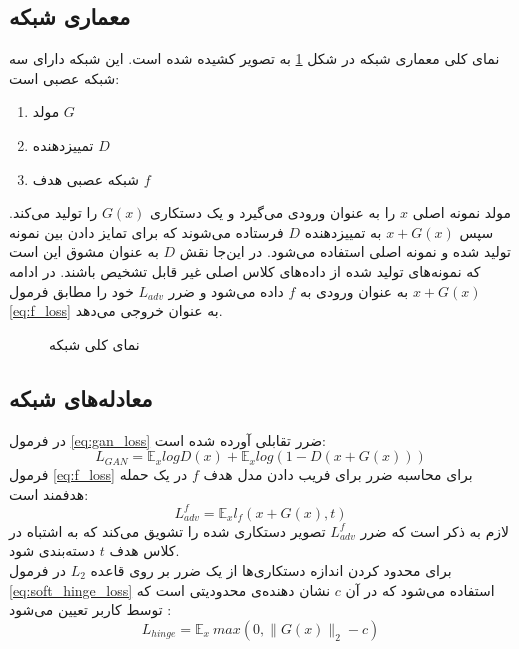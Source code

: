 \subsection{معماری شبکه}
نمای کلی معماری شبکه
در شکل 
\ref{advgan_arch}
به تصویر کشیده شده است. 
این شبکه دارای سه شبکه عصبی است:
\begin{enumerate}
	\item
	مولد $G$
	\item
	تمییزدهنده $D$
	\item
	شبکه عصبی هدف $f$
\end{enumerate}
مولد نمونه‌ اصلی 
$x$
را به عنوان ورودی می‌گیرد و یک دستکاری
$G(x)$
را تولید می‌کند. سپس 
$x + G(x)$
به تمییزدهنده
$D$
فرستاده می‌شوند که برای تمایز دادن بین نمونه تولید شده و نمونه اصلی استفاده می‌شود. در این‌جا نقش
$D$
به عنوان مشوق این است که نمونه‌های تولید شده از داده‌های کلاس اصلی غیر قابل تشخیص باشند.
در ادامه
$x + G(x)$
به عنوان ورودی به 
$f$
داده‌ می‌شود و ضرر 
$L_{adv}$
خود را مطابق فرمول
\ref{eq:f_loss}
به عنوان خروجی می‌دهد.
\cite{Xiao2018GeneratingAE} 
\\ 
\begin{figure}[H]
	\caption{نمای کلی شبکه 
		\cite{Xiao2018GeneratingAE}}
	\label{advgan_arch}
\end{figure}

\subsection{معادله‌های شبکه}
در فرمول 
\ref{eq:gan_loss}
ضرر تقابلی
آورده شده است:
\begin{equation} \label{eq:gan_loss}
	L_{GAN} = \mathbb{E}_x log D(x) + \mathbb{E}_x log (1- D(x + G(x)))
\end{equation}
فرمول 
\ref{eq:f_loss}
برای محاسبه ضرر برای فریب دادن مدل هدف 
$f$
در یک حمله هدفمند است:
\begin{equation} \label{eq:f_loss}
	L^f_{adv} = \mathbb{E}_x l_f(x + G(x), t)
\end{equation}
لازم به ذکر است که ضرر
$L^f_{adv}$
تصویر دستکاری شده را تشویق می‌کند که به اشتباه در کلاس هدف 
$t$
دسته‌بندی شود.
\\
برای محدود کردن اندازه دستکاری‌ها از یک ضرر
 بر روی قاعده 
$L_2$
در فرمول 
\ref{eq:soft_hinge_loss}
استفاده می‌شود که در آن 
$c$
نشان دهنده‌ی محدودیتی است که توسط کاربر تعیین ‌می‌شود
:
\begin{equation} \label{eq:soft_hinge_loss}
	L_{hinge} = \mathbb{E}_x\:max(0, \|G(x)\|_2 - c)
\end{equation}

